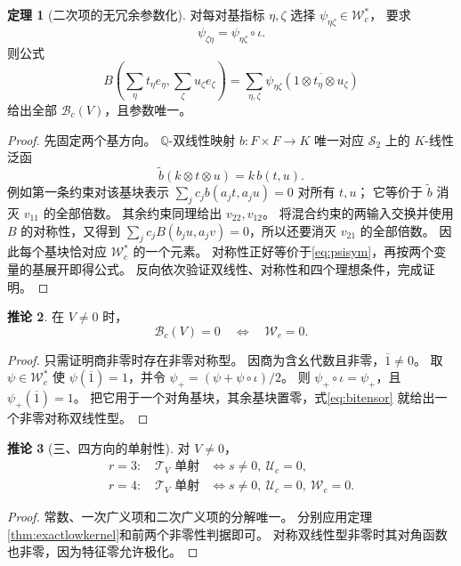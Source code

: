 \documentclass[UTF8,11pt,a4paper]{ctexart}
\theoremstyle{definition}
\newtheorem{theorem}{定理}[section]
\newtheorem{corollary}[theorem]{推论}
\newcommand{\Q}{\mathbb Q}
\newcommand{\T}{\mathcal T}
\newcommand{\Uc}{\mathscr U_c}
\newcommand{\Wc}{\mathscr W_c}
\numberwithin{equation}{section}
\begin{document}
\begin{theorem}[二次项的无冗余参数化]\label{thm:bitensor}
对每对基指标 $\eta,\zeta$ 选择 $\psi_{\eta\zeta}\in\Wc^*$，
要求
\begin{equation}\label{eq:psisym}
 \psi_{\zeta\eta}=\psi_{\eta\zeta}\circ\iota.
\end{equation}
则公式
\begin{equation}\label{eq:bitensor}
 B\!\left(\sum_\eta t_\eta e_\eta,\sum_\zeta u_\zeta e_\zeta\right)
 =
 \sum_{\eta,\zeta}
 \psi_{\eta\zeta}\!\left(\overline{1\otimes t_\eta\otimes u_\zeta}\right)
\end{equation}
给出全部 $\mathcal B_c(V)$，且参数唯一。
\end{theorem}
\begin{proof}
先固定两个基方向。
$\Q$-双线性映射 $b:F\times F\to K$ 唯一对应
$\mathscr S_2$ 上的 $K$-线性泛函
\[
 \widetilde b(k\otimes t\otimes u)=k\,b(t,u).
\]
例如第一条约束对该基块表示
$\sum_jc_jb(a_jt,a_ju)=0$ 对所有 $t,u$；
它等价于 $\widetilde b$ 消灭 $v_{11}$ 的全部倍数。
其余约束同理给出 $v_{22},v_{12}$。
将混合约束的两输入交换并使用 $B$ 的对称性，又得到
$\sum_jc_jB(b_ju,a_jv)=0$，所以还要消灭 $v_{21}$ 的全部倍数。
因此每个基块恰对应 $\Wc^*$ 的一个元素。
对称性正好等价于\eqref{eq:psisym}，再按两个变量的基展开即得公式。
反向依次验证双线性、对称性和四个理想条件，完成证明。
\end{proof}

\begin{corollary}\label{cor:binonzero}
在 $V\ne0$ 时，
\[
 \mathcal B_c(V)=0\quad\Longleftrightarrow\quad\Wc=0.
\]
\end{corollary}
\begin{proof}
只需证明商非零时存在非零对称型。
因商为含幺代数且非零，$\overline1\ne0$。
取 $\psi\in\Wc^*$ 使 $\psi(\overline1)=1$，并令
$\psi_+=(\psi+\psi\circ\iota)/2$。
则 $\psi_+\circ\iota=\psi_+$，且 $\psi_+(\overline1)=1$。
把它用于一个对角基块，其余基块置零，式\eqref{eq:bitensor}
就给出一个非零对称双线性型。
\end{proof}

\begin{corollary}[三、四方向的单射性]\label{cor:tensorinject}
对 $V\ne0$，
\[
 \begin{aligned}
 r=3:\quad\T_V\text{ 单射}
 &\Longleftrightarrow s\ne0,\ \Uc=0,\\
 r=4:\quad\T_V\text{ 单射}
 &\Longleftrightarrow s\ne0,\ \Uc=0,\ \Wc=0.
 \end{aligned}
\]
\end{corollary}
\begin{proof}
常数、一次广义项和二次广义项的分解唯一。
分别应用定理\ref{thm:exactlowkernel}和前两个非零性判据即可。
对称双线性型非零时其对角函数也非零，因为特征零允许极化。
\end{proof}
\end{document}
